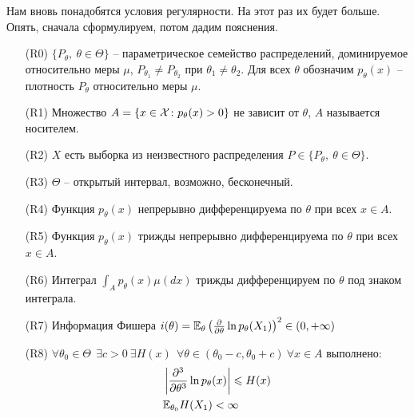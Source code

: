 \begin{definition}
    Нам вновь понадобятся условия регулярности. На этот раз их будет больше. Опять, сначала сформулируем, потом дадим пояснения.

    \begin{itemize}
        \item[(R0)] $\{P_\theta,\ \theta \in \Theta\}$ -- параметрическое семейство распределений, доминируемое относительно меры $\mu$, $P_{\theta_1} \neq P_{\theta_2}$ при $\theta_1 \neq \theta_2$. Для всех $\theta$ обозначим $p_\theta(x)$ -- плотность $P_\theta$ относительно меры $\mu$.

        \item[(R1)] Множество $A = \{x \in \mathcal{X} \colon p_\theta(x) > 0\}$ не зависит от $\theta$, $A$ называется носителем.

        \item[(R2)] $X$ есть выборка из неизвестного распределения $P \in \{P_\theta,\ \theta \in \Theta\}$.

        \item[(R3)] $\Theta$ -- открытый интервал, возможно, бесконечный.

        \item[(R4)] Функция $p_\theta(x)$ непрерывно дифференцируема по $\theta$ при всех $x \in A$.

        \item[(R5)] Функция $p_\theta(x)$ трижды непрерывно дифференцируема по $\theta$ при всех $x \in A$.

        \item[(R6)] Интеграл $\int_A p_\theta(x) \mu(dx)$ трижды дифференцируем по $\theta$ под знаком интеграла.

        \item[(R7)] Информация Фишера $i(\theta) = \mathbb{E}_\theta \left(\frac{\partial}{\partial \theta} \ln p_\theta(X_1)\right)^2 \in (0, +\infty)$

        \item[(R8)] $\forall \theta_0 \in \Theta \ \ \exists c > 0 \ \exists H(x) \ \ \forall \theta \in (\theta_0 - c, \theta_0 + c) \ \forall x \in A$ выполнено:
        \begin{align*}
            & \left|\frac{\partial^3}{\partial \theta^3} \ln p_\theta(x)\right| \leqslant H(x)
            \\
            & \mathbb{E}_{\theta_0} H(X_1) < \infty
        \end{align*}        
    \end{itemize}
\end{definition}

